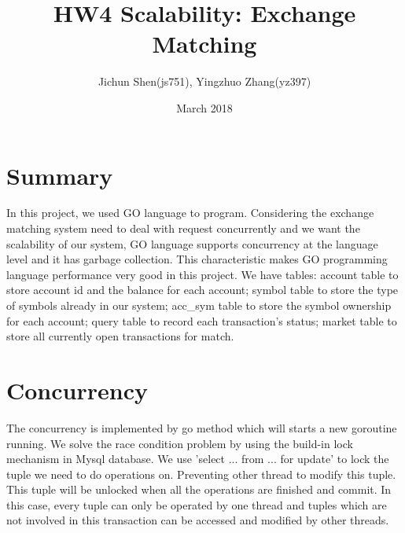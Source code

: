 \documentclass{article}
\title{HW4 Scalability: Exchange Matching}
\author{Jichun Shen(js751), Yingzhuo Zhang(yz397)}
\date{March 2018}
\begin{document}
\maketitle              %

\section{Summary}
%
In this project, we used GO language to program. Considering the exchange matching system need to deal with request concurrently and we want the scalability of our system, GO language supports concurrency at the language level and it has garbage collection. This characteristic makes GO programming language performance very good in this project.
%
We have tables: account table to store account id and the balance for each account; symbol table to store the type of symbols already in our system; acc\_sym table to store the symbol ownership for each account; query table to record each transaction's status; market table to store all currently open transactions for match.
%
\section{Concurrency}
%
The concurrency is implemented by go method which will starts a new goroutine running. We solve the race condition problem by using the build-in lock mechanism in Mysql database. We use 'select ... from ... for update' to lock the tuple we need to do operations on. Preventing other thread to modify this tuple. This tuple will be unlocked when all the operations are finished and commit. In this case, every tuple can only be operated by one thread and tuples which are not involved in this transaction can be accessed and modified by other threads.
%
\end{document}
